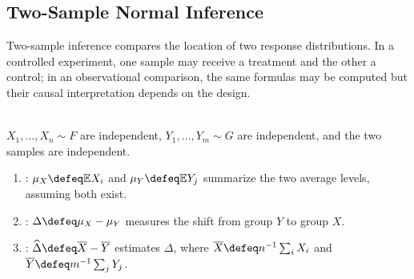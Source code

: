\subsection{Two-Sample Normal Inference}

Two-sample inference compares the location of two response distributions.  In a controlled experiment, one sample may receive a treatment and the other a control; in an observational comparison, the same formulas may be computed but their causal interpretation depends on the design.

\begin{definition} \label{def:two-independent-sample-location-model} \\
$X_1,\ldots,X_n\sim F$ are independent, $Y_1,\ldots,Y_m\sim G$ are independent, and the two samples are independent.
\begin{enumerate}[label=(\roman*)]
\setlength{\itemsep}{0pt}
\item {}: $\mu_X\defeq\mathbb{E}X_i$ and $\mu_Y\defeq\mathbb{E}Y_j$ summarize the two average levels, assuming both exist.
\item {}: $\Delta\defeq\mu_X-\mu_Y$ measures the shift from group $Y$ to group $X$.
\item {}: $\widehat{\Delta}\defeq\overline{X}-\overline{Y}$ estimates $\Delta$, where $\overline{X}\defeq n^{-1}\sum_iX_i$ and $\overline{Y}\defeq m^{-1}\sum_jY_j$.
\end{enumerate}
\end{definition}

